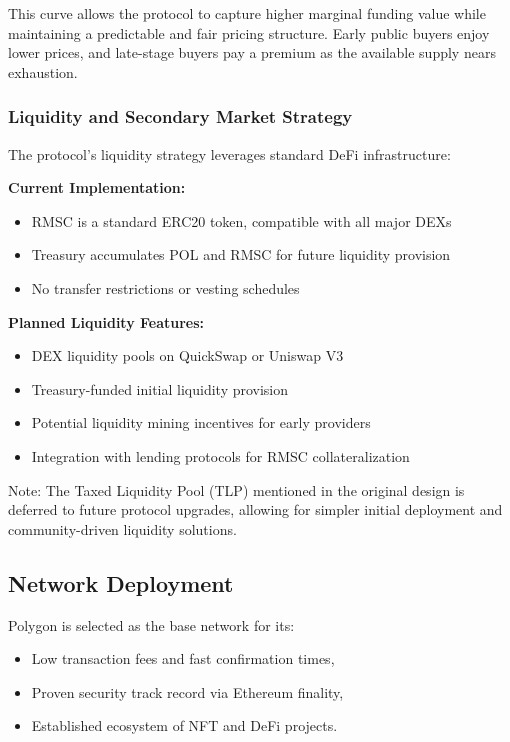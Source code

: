 \documentclass[conference]{IEEEtran}
\begin{document}
This curve allows the protocol to capture higher marginal funding value while maintaining a predictable and fair pricing structure. Early public buyers enjoy lower prices, and late-stage buyers pay a premium as the available supply nears exhaustion.

\subsubsection{Liquidity and Secondary Market Strategy}

The protocol's liquidity strategy leverages standard DeFi infrastructure:

\textbf{Current Implementation:}
\begin{itemize}
    \item RMSC is a standard ERC20 token, compatible with all major DEXs
    \item Treasury accumulates POL and RMSC for future liquidity provision
    \item No transfer restrictions or vesting schedules
\end{itemize}

\textbf{Planned Liquidity Features:}
\begin{itemize}
    \item DEX liquidity pools on QuickSwap or Uniswap V3
    \item Treasury-funded initial liquidity provision
    \item Potential liquidity mining incentives for early providers
    \item Integration with lending protocols for RMSC collateralization
\end{itemize}

Note: The Taxed Liquidity Pool (TLP) mentioned in the original design is deferred to future protocol upgrades, allowing for simpler initial deployment and community-driven liquidity solutions.


\subsection{Network Deployment}

Polygon is selected as the base network for its:
\begin{itemize}
    \item Low transaction fees and fast confirmation times,
    \item Proven security track record via Ethereum finality,
    \item Established ecosystem of NFT and DeFi projects.
\end{itemize}
\end{document}
